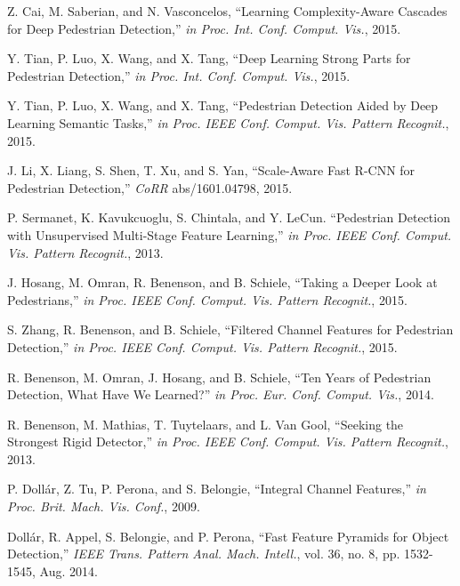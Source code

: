 \documentclass[journal]{IEEEtran}
\begin{document}
\begin{thebibliography}{1}

Z. Cai, M. Saberian, and N. Vasconcelos, ``Learning Complexity-Aware Cascades for Deep Pedestrian Detection,'' \emph{in Proc. Int. Conf. Comput. Vis.}, 2015.

Y. Tian, P. Luo, X. Wang, and X. Tang, ``Deep Learning Strong Parts for Pedestrian Detection,'' \emph{in Proc. Int. Conf. Comput. Vis.}, 2015.

Y. Tian, P. Luo, X. Wang, and X. Tang, ``Pedestrian Detection Aided by Deep Learning Semantic Tasks,'' \emph{in Proc. IEEE Conf. Comput. Vis. Pattern Recognit.}, 2015.

J. Li, X. Liang, S. Shen, T. Xu, and S. Yan, ``Scale-Aware Fast R-CNN for Pedestrian Detection,'' \emph{CoRR} abs/1601.04798, 2015.

P. Sermanet, K. Kavukcuoglu, S. Chintala, and Y. LeCun. ``Pedestrian Detection with Unsupervised Multi-Stage Feature Learning,'' \emph{in Proc. IEEE Conf. Comput. Vis. Pattern Recognit.}, 2013.

J. Hosang, M. Omran, R. Benenson, and B. Schiele, ``Taking a Deeper Look at Pedestrians,'' \emph{in Proc. IEEE Conf. Comput. Vis. Pattern Recognit.}, 2015.

S. Zhang, R. Benenson, and B. Schiele, ``Filtered Channel Features for Pedestrian Detection,'' \emph{in Proc. IEEE Conf. Comput. Vis. Pattern Recognit.}, 2015.

R. Benenson, M. Omran, J. Hosang, and B. Schiele, ``Ten Years of Pedestrian Detection, What Have We Learned?'' \emph{in Proc. Eur. Conf. Comput. Vis.}, 2014.


R. Benenson, M. Mathias, T. Tuytelaars, and L. Van Gool, ``Seeking the Strongest Rigid Detector,'' \emph{in Proc. IEEE Conf. Comput. Vis. Pattern Recognit.}, 2013.

P. Doll\'{a}r, Z. Tu, P. Perona, and S. Belongie, ``Integral Channel Features,'' \emph{in Proc. Brit. Mach. Vis. Conf.}, 2009.


Doll\'{a}r, R. Appel, S. Belongie, and P. Perona, ``Fast Feature Pyramids for Object Detection,'' \emph{IEEE Trans. Pattern Anal. Mach. Intell.}, vol. 36, no. 8, pp. 1532-1545, Aug. 2014.


\end{thebibliography}
\end{document}
